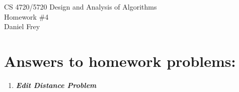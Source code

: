 \documentclass[11pt]{article}
\begin{document}
 

\rhead{\today}

\begin{center}
\begin{Large}
	CS 4720/5720 Design and Analysis of Algorithms \\
	Homework \#4 \\
	Daniel Frey
\end{Large}
\end{center}

\section*{Answers to homework problems:}

\begin{enumerate}
	\item
		\textbf{\textit{Edit Distance Problem}}


\end{enumerate}
\end{document}
